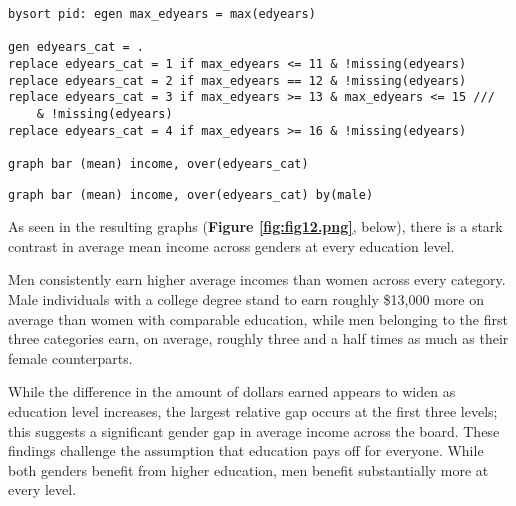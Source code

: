 


\begin{verbatim}
bysort pid: egen max_edyears = max(edyears)

gen edyears_cat = .
replace edyears_cat = 1 if max_edyears <= 11 & !missing(edyears)
replace edyears_cat = 2 if max_edyears == 12 & !missing(edyears)
replace edyears_cat = 3 if max_edyears >= 13 & max_edyears <= 15 ///
	& !missing(edyears)
replace edyears_cat = 4 if max_edyears >= 16 & !missing(edyears)

graph bar (mean) income, over(edyears_cat)
\end{verbatim}



\begin{verbatim}
graph bar (mean) income, over(edyears_cat) by(male)
\end{verbatim}

As seen in the resulting graphs (\textbf{Figure \ref{fig:fig12.png}}, below), there is a stark contrast in average mean income across genders at every education level. 

Men consistently earn higher average incomes than women across every category. Male individuals with a college degree stand to earn roughly \$13,000 more on average than women with comparable education, while men belonging to the first three categories earn, on average, roughly three and a half times as much as their female counterparts. 

While the difference in the amount of dollars earned appears to widen as education level increases, the largest relative gap occurs at the first three levels; this suggests a significant gender gap in average income across the board. These findings challenge the assumption that education pays off for everyone. While both genders benefit from higher education, men benefit substantially more at every level.

